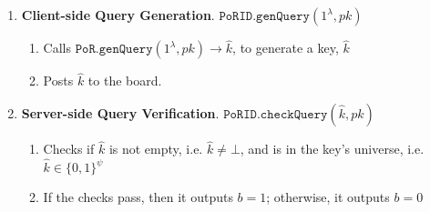 \begin{enumerate}
 


\item\textbf{Client-side Query Generation}. $\mathtt{PoRID.genQuery}(1^{\lambda},  pk)$ 
\begin{enumerate}
\item Calls $\mathtt{PoR.genQuery}(1^{\lambda}, pk)\rightarrow \hat{k}$, to generate a key, $\hat{k}$ %
\item Posts $\hat{k}$ to the board. 
\end{enumerate}




\item\textbf{Server-side Query Verification}. $\mathtt{PoRID.checkQuery}(\hat{k}, pk)$
\begin{enumerate}
\item  Checks if  $\hat{k}$ is not empty, i.e. $\hat{k}\neq \bot$, and is in the key's universe, i.e. $\hat{k}\in \{0,1\}^{\scriptscriptstyle\psi}$%
\item  If the checks pass, then it outputs $b=1$; otherwise, it outputs $b=0$

\end{enumerate}
%


\end{enumerate}
